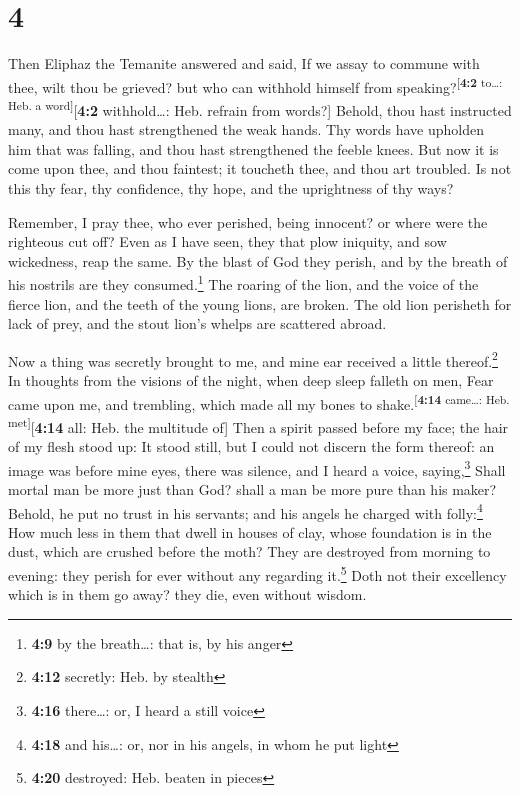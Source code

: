 \hypertarget{section-3}{%
\section{4}\label{section-3}}

 Then Eliphaz the Temanite answered and said,
 If we assay to commune with thee, wilt thou be grieved?
but who can withhold himself from
speaking?\textsuperscript{{[}\textbf{4:2} to\ldots: Heb. a
word{]}}{[}\textbf{4:2} withhold\ldots: Heb. refrain from words?{]}
 Behold, thou hast instructed many, and thou hast
strengthened the weak hands.  Thy words have upholden him
that was falling, and thou hast strengthened the feeble knees.
 But now it is come upon thee, and thou faintest; it
toucheth thee, and thou art troubled.  Is not this thy
fear, thy confidence, thy hope, and the uprightness of thy ways?

 Remember, I pray thee, who ever perished, being innocent?
or where were the righteous cut off?  Even as I have seen,
they that plow iniquity, and sow wickedness, reap the same.
 By the blast of God they perish, and by the breath of his
nostrils are they consumed.\footnote{\textbf{4:9} by the breath\ldots:
  that is, by his anger}  The roaring of the lion, and
the voice of the fierce lion, and the teeth of the young lions, are
broken.  The old lion perisheth for lack of prey, and the
stout lion's whelps are scattered abroad.

 Now a thing was secretly brought to me, and mine ear
received a little thereof.\footnote{\textbf{4:12} secretly: Heb. by
  stealth}  In thoughts from the visions of the night,
when deep sleep falleth on men,  Fear came upon me, and
trembling, which made all my bones to
shake.\textsuperscript{{[}\textbf{4:14} came\ldots: Heb.
met{]}}{[}\textbf{4:14} all: Heb. the multitude of{]} 
Then a spirit passed before my face; the hair of my flesh stood up:
 It stood still, but I could not discern the form
thereof: an image was before mine eyes, there was silence, and I heard a
voice, saying,\footnote{\textbf{4:16} there\ldots: or, I heard a still
  voice}  Shall mortal man be more just than God? shall a
man be more pure than his maker?  Behold, he put no trust
in his servants; and his angels he charged with folly:\footnote{\textbf{4:18}
  and his\ldots: or, nor in his angels, in whom he put light}
 How much less in them that dwell in houses of clay,
whose foundation is in the dust, which are crushed before the moth?
 They are destroyed from morning to evening: they perish
for ever without any regarding it.\footnote{\textbf{4:20} destroyed:
  Heb. beaten in pieces}  Doth not their excellency which
is in them go away? they die, even without wisdom.

